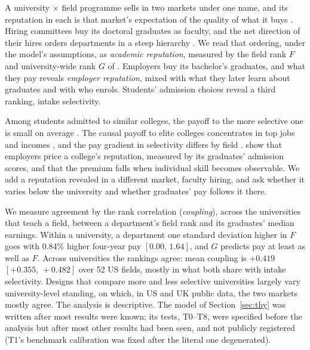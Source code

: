 \documentclass[11pt]{article}
\newcommand{\ci}[2]{$[#1,\allowbreak\,#2]$}
\begin{document}
A university $\times$ field programme sells in two markets under one name, and its reputation in each is that
market's expectation of the quality of what it buys \citep{tadelis1999name, macleod2015reputation}. Hiring committees
buy its doctoral graduates as faculty, and the net direction of their hires orders departments in a steep hierarchy
\citep{clauset2015systematic}. We read that ordering, under the model's assumptions, as \emph{academic reputation},
measured by the field rank $F$ and university-wide rank $G$ of \citet{wapman2022quantifying}. Employers buy its
bachelor's graduates, and what they pay reveals \emph{employer reputation}, mixed with what they later learn about
graduates and with who enrols. Students' admission choices reveal a third ranking, intake selectivity.

Among students admitted to similar colleges, the payoff to the more selective one is small on average
\citep{dale2002estimating, dale2014estimating}. The causal payoff to elite colleges concentrates in top jobs and
incomes \citep{zimmerman2019elite, chetty2023diversifying}, and the pay gradient in selectivity differs by field
\citep{bloem2024understanding}. \citet{macleod2017big} show that employers price a college's reputation, measured by
its graduates' admission scores, and that the premium falls when individual skill becomes observable. We add a
reputation revealed in a different market, faculty hiring, and ask whether it varies below the university and whether
graduates' pay follows it there.

We measure agreement by the rank correlation (\emph{coupling}), across the universities that teach a field, between a
department's field rank and its graduates' median earnings. Within a university, a department one standard deviation
higher in $F$ goes with 0.84\% higher four-year pay \ci{0.00}{1.64}, and $G$ predicts pay at least as well as $F$.
Across universities the rankings agree: mean coupling is $+0.419$ \ci{+0.355}{+0.482} over 52 US fields, mostly in
what both share with intake selectivity. Designs that compare more and less selective universities
\citep{dale2002estimating, anelli2020returns} largely vary university-level standing, on which, in US and UK public
data, the two markets mostly agree. The analysis is descriptive. The model of Section~\ref{sec:thy} was written after
most results were known; its tests, T0--T8, were specified before the analysis but after most other results had been
seen, and not publicly registered (T1's benchmark calibration was fixed after the literal one degenerated).
\end{document}
